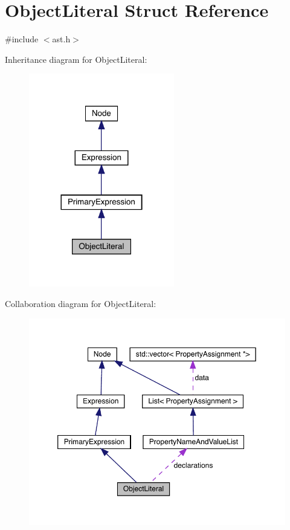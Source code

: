 \hypertarget{struct_object_literal}{}\section{Object\+Literal Struct Reference}
\label{struct_object_literal}


{\ttfamily \#include $<$ast.\+h$>$}



Inheritance diagram for Object\+Literal\+:
\nopagebreak
\begin{figure}[H]
\begin{center}
\leavevmode
\includegraphics[width=180pt]{struct_object_literal__inherit__graph}
\end{center}
\end{figure}


Collaboration diagram for Object\+Literal\+:
\nopagebreak
\begin{figure}[H]
\begin{center}
\leavevmode
\includegraphics[width=350pt]{struct_object_literal__coll__graph}
\end{center}
\end{figure}
